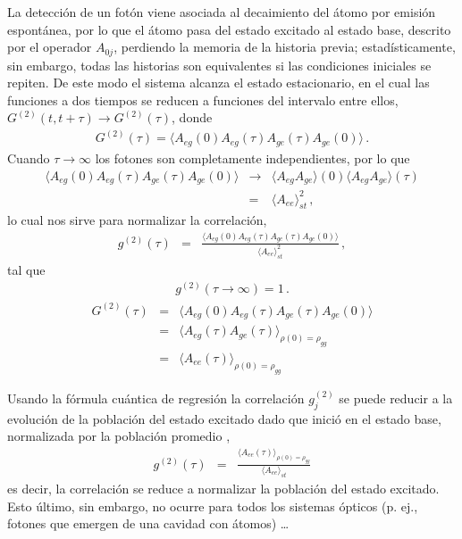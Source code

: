 \documentclass[twocolumn,aps,eqsecnum]{revtex4}
\begin{document}
La detecci\'on de un fot\'on viene asociada al decaimiento del \'atomo por 
emisi\'on espont\'anea, por lo que el \'atomo pasa del estado excitado al 
estado base, descrito por el operador $A_{0j}$, perdiendo la memoria de la 
historia previa; estad\'isticamente, sin embargo, todas las historias son 
equivalentes si las condiciones iniciales se repiten. De este modo el sistema 
alcanza el estado estacionario, en el cual las funciones a dos tiempos se 
reducen a funciones del intervalo entre ellos, 
$G^{(2)} (t,t+\tau) \to G^{(2)} (\tau)$,  donde 
%
\begin{eqnarray}
G^{(2)} (\tau) 
	= \langle A_{eg} (0) A_{eg} (\tau)  A_{ge} (\tau) A_{ge} (0) \rangle \,.
\end{eqnarray} 	
Cuando $\tau \to \infty$ los fotones son completamente 
independientes, por lo que 
%
\begin{eqnarray}
\langle A_{eg} (0) A_{eg} (\tau)  A_{ge} (\tau) A_{ge} (0) \rangle &\to&  
	\langle A_{eg} A_{ge} \rangle(0) \langle A_{eg} A_{ge} \rangle(\tau) 	\nonumber \\ 
	&=& \langle A_{ee} \rangle_{st}^2 \,, 
\end{eqnarray} 	
lo cual nos sirve para normalizar la correlaci\'on,
%
\begin{eqnarray}
g^{(2)} (\tau) 
	&=& \frac{ \langle A_{eg} (0) A_{eg} (\tau)  A_{ge} (\tau) A_{ge} (0) \rangle }
	{ \langle A_{ee} \rangle_{st}^2 } \,, 
\end{eqnarray} 	
tal que  
%
\begin{eqnarray} 
g^{(2)} (\tau \to \infty) = 1 \,. 
\end{eqnarray} 	
%
\begin{eqnarray*}
G^{(2)} (\tau) 
	&=& \langle A_{eg} (0) A_{eg} (\tau)  A_{ge} (\tau) A_{ge} (0) \rangle 	\\
	&=&  \langle A_{eg} (\tau)  A_{ge} (\tau) \rangle_{\rho(0)=\rho_{gg}} \\ 
	&=& \langle A_{ee} (\tau) \rangle_{\rho(0)=\rho_{gg}}
\end{eqnarray*} 	

Usando la f\'ormula cu\'antica de regresi\'on la correlaci\'on $g_j^{(2)}$ se 
puede reducir a la evoluci\'on de la poblaci\'on del estado excitado dado que 
inici\'o en el estado base, normalizada por la poblaci\'on promedio 
\cite{Carm99}, 
%
\begin{eqnarray}
g^{(2)} (\tau) &=& \frac{ \langle A_{ee} (\tau)\rangle_{\rho(0)=\rho_{gg}} }
	{ \langle A_{ee} \rangle_{st} }
\end{eqnarray}
es decir, la correlaci\'on se reduce a normalizar la poblaci\'on del estado 
excitado. Esto \'ultimo, sin embargo, no ocurre para todos los sistemas 
\'opticos (p. ej., fotones que emergen de una cavidad con \'atomos) \ldots 
\end{document}
